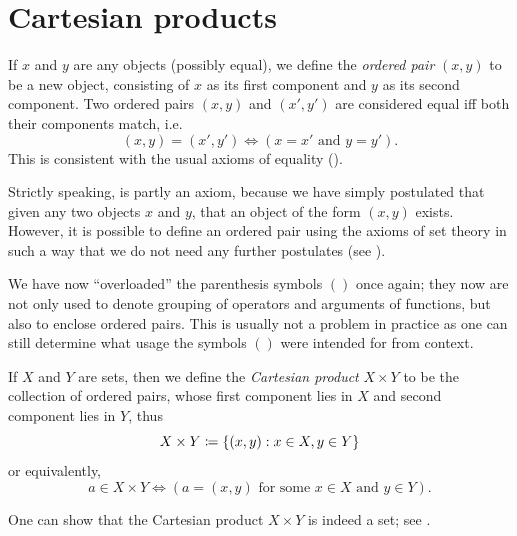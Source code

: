 \section{Cartesian products}\label{i:sec:3.5}

\begin{defn}\label{i:3.5.1}
  If \(x\) and \(y\) are any objects (possibly equal), we define the \emph{ordered pair} \((x, y)\) to be a new object, consisting of \(x\) as its first component and \(y\) as its second component.
  Two ordered pairs \((x, y)\) and \((x', y')\) are considered equal iff both their components match, i.e.
  \[
    (x, y) = (x', y') \iff (x = x' \text{ and } y = y').
  \]
  This is consistent with the usual axioms of equality ().
\end{defn}

\begin{rmk}\label{i:3.5.2}
  Strictly speaking,  is partly an axiom, because we have simply postulated that given any two objects \(x\) and \(y\), that an object of the form \((x, y)\) exists.
  However, it is possible to define an ordered pair using the axioms of set theory in such a way that we do not need any further postulates (see ).
\end{rmk}

\begin{rmk}\label{i:3.5.3}
  We have now ``overloaded'' the parenthesis symbols \(()\) once again;
  they now are not only used to denote grouping of operators and arguments of functions, but also to enclose ordered pairs.
  This is usually not a problem in practice as one can still determine what usage the symbols \(()\) were intended for from context.
\end{rmk}

\begin{defn}\label{i:3.5.4}
  If \(X\) and \(Y\) are sets, then we define the \emph{Cartesian product} \(X \times Y\) to be the collection of ordered pairs, whose first component lies in \(X\) and second component lies in \(Y\), thus
  \[
    X \times Y \coloneqq \left\lbrace(x, y) : x \in X, y \in Y\right\rbrace
  \]
  or equivalently,
  \[
    a \in X \times Y \iff (a = (x, y) \text{ for some } x \in X \text{ and } y \in Y).
  \]
\end{defn}

\begin{rmk}\label{i:3.5.5}
  One can show that the Cartesian product \(X \times Y\) is indeed a set;
  see .
\end{rmk}

